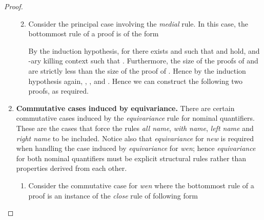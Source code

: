 \begin{proof}
\begin{enumerate}[label=\textbf{\Alph*},ref=\Alph*,leftmargin=*]
\begin{enumerate}[label*=\textbf{.\arabic*}]
\begin{comment} Case for \textit{with name}, omitted for readability.
Consider the principal case involving the \textit{with name} rule.
In this case, the bottommost rule is of the form  such that .
By the induction hypothesis, there exist  and  such that  and  and  
and either  or . Furthermore, the size of the proof of  is strictly less than the size of the proof of .
By the induction hypothesis again,  and  hold.
Now if  then  and so .
Otherwise  so .
Hence .
By a similar argument, .
Thereby we can construct the following two proofs as follows.

Furthermore 
and , hence the size of proofs strictly decrease as requried.
\smallskip
\end{comment}


\item Consider the principal case involving the \textit{medial} rule.
In this case, the bottommost rule of a proof is of the form 

By the induction hypothesis, for  there exists  and  such that  and  hold, and -ary killing context  such that 
.
Furthermore, the size of the proofs of  and  are strictly less than the size of the proof of . Hence by the induction hypothesis again, , ,  and .
Hence we can construct the following two proofs, as required.



\end{enumerate}


\item \textbf{Commutative cases induced by equivariance.}
There are certain commutative cases induced by the \textit{equivariance} rule for nominal quantifiers.
These are the cases that force the rules \textit{all name}, \textit{with name}, \textit{left name} and \textit{right name} to be included.
Notice also that \textit{equivariance} for \textit{new} is required when handling the case induced by \textit{equivariance} for \textit{wen}; hence \textit{equivariance} for both nominal quantifiers must be explicit structural rules rather than properties derived from each other.


\begin{enumerate}[label*=\textbf{.\arabic*}]
\item Consider the commutative case for \textit{wen} where the bottommost rule of a proof is an instance of the \textit{close} rule of following form


\end{enumerate}
\end{enumerate}
\end{proof}
